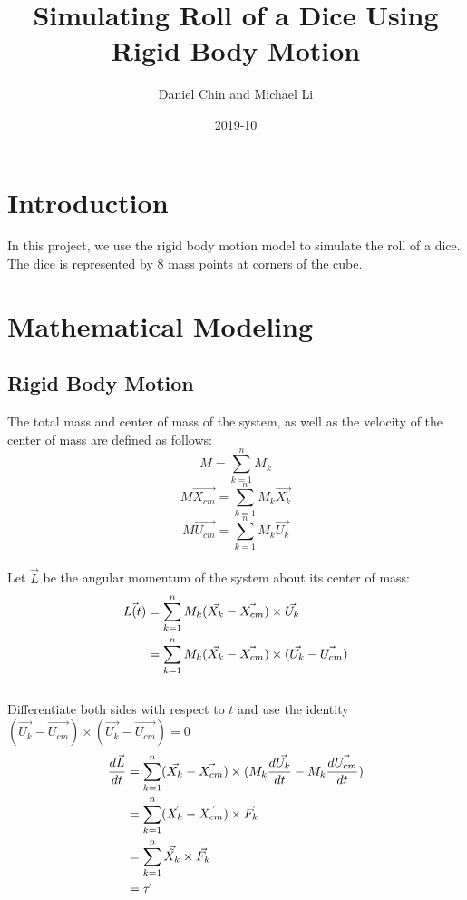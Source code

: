 \documentclass[12pt]{article}
\title{Simulating Roll of a Dice Using Rigid Body Motion}
\date{2019-10}
\author{Daniel Chin and Michael Li}
\begin{document}
\maketitle
\section{Introduction}
In this project, we use the rigid body motion model to simulate the roll of a dice. The dice is represented by 8 mass points at corners of the cube. 
\section{Mathematical Modeling}
\subsection{Rigid Body Motion}
The total mass and center of mass of the system, as well as the velocity of the center of mass are defined as follows:\\
\begin{equation}
M=\sum_{k=1}^{n}M_{k}
\end{equation}
\begin{equation}
M\vec{X_{cm}}=\sum_{k=1}^{n}{M_{k}{\vec{X_{k}}}}
\end{equation}
\begin{equation}
M\vec{U_{cm}}=\sum_{k=1}^{n}{M_{k}{\vec{U_{k}}}}
\end{equation}\\
Let $\vec{L}$ be the angular momentum of the system about its center of mass:\\
\begin{equation}
\aligned
\vec{L(t)}&=\sum_{k=1}^{n}M_{k}(\vec{X_{k}}-\vec{X_{cm}})\times \vec{U_{k}}\\
&={\sum_{k=1}^{n}M_{k}(\vec{X_{k}}-\vec{X_{cm}})\times (\vec{U_{k}}-\vec{U_{cm}})}
\endaligned
\end{equation}\\
Differentiate both sides with respect to $t$ and use the identity $(\vec{U_{k}}-\vec{U_{cm}})\times (\vec{U_{k}}-\vec{U_{cm}})=0$\\
\begin{equation}
\aligned
\frac{d{\vec{L}}}{dt}&=\sum_{k=1}^{n}(\vec{X_{k}}-\vec{X_{cm}})\times (M_{k}\frac{d{\vec{U_{k}}}}{dt}-M_{k}\frac{d{\vec{U_{cm}}}}{dt})\\
&=\sum_{k=1}^{n}(\vec{X_{k}}-\vec{X_{cm}})\times \vec{F_{k}}\\
&=\sum_{k=1}^{n}\vec{\tilde{X_{k}}}\times \vec{F_{k}}\\
&=\vec{\tau}
\endaligned
\end{equation}
\end{document}
